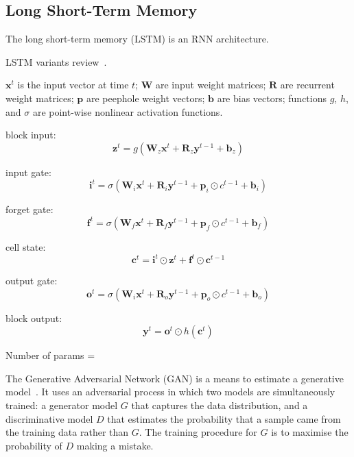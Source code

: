 
\subsection{Long Short-Term Memory}

The long short-term memory (LSTM) is an RNN architecture.

LSTM variants review~\cite{Greff2015}.

$\bm{x}^t$ is the input vector at time $t$; $\bm{W}$ are input weight matrices; $\bm{R}$ are recurrent weight matrices; $\bm{p}$ are peephole weight vectors; $\bm{b}$ are bias vectors; functions $g$, $h$, and $\sigma$ are point-wise nonlinear activation functions.

block input:
\[ \bm{z}^{t} = g \left( \bm{W}_z \bm{x}^t + \bm{R}_z \bm{y}^{t - 1} + \bm{b}_z \right) \]

input gate:
\[ \bm{i}^{t} = \sigma \left( \bm{W}_i \bm{x}^t + \bm{R}_i \bm{y}^{t-1} + \bm{p}_i \odot c^{t-1} + \bm{b}_i \right) \]

forget gate:
\[ \bm{f}^{t} = \sigma \left( \bm{W}_f \bm{x}^t + \bm{R}_f \bm{y}^{t-1} + \bm{p}_f \odot c^{t-1} + \bm{b}_f \right) \]

cell state:
\[ \bm{c}^t = \bm{i}^t \odot \bm{z}^t + \bm{f}^t \odot \bm{c}^{t-1} \]

output gate:
\[ \bm{o}^{t} = \sigma \left( \bm{W}_i \bm{x}^t + \bm{R}_o \bm{y}^{t - 1} + \bm{p}_o \odot c^{t-1} + \bm{b}_o \right) \]

block output:
\[ \bm{y}^t = \bm{o}^t \odot h(\bm{c}^t) \]

Number of params = \todo[inline]{\ldots}



The Generative Adversarial Network (GAN) is a means to estimate a generative model~\cite{Goodfellow2014}. It uses an adversarial process in which two models are simultaneously trained: a generator model $G$ that captures the data distribution, and a discriminative model $D$ that estimates the probability that a sample came from the training data rather than $G$. The training procedure for $G$ is to maximise the probability of $D$ making a mistake.

